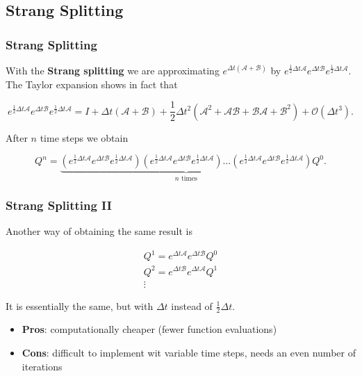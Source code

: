 \documentclass{beamer}
\newcommand{\ca}{\mathcal{A}}
\newcommand{\cb}{\mathcal{B}}
\renewcommand{\d}{\Delta}
\renewcommand{\emph}[1]{\textcolor{tum}{\textbf{#1}}}
\begin{document}
\subsection{Strang Splitting}
\begin{frame}
	\frametitle{Strang Splitting}
	With the \emph{Strang splitting} we are approximating $e^{\d t(\ca +\cb)}$ by $e^{\frac{1}{2}\d t\ca}e^{\d t\cb}e^{\frac{1}{2}\d t\ca}$. The Taylor expansion shows in fact that

	\begin{equation}
		e^{\frac{1}{2}\d t\ca}e^{\d t\cb}e^{\frac{1}{2}\d t\ca} = I+\d t(\ca + \cb)+\frac{1}{2}\d t^2(\ca^2+\ca\cb+\cb\ca+\cb^2)+\mathcal{O}(\d t^3).
	\end{equation}

	After $n$ time steps we obtain

	\begin{equation}\label{eq:recursion}
		Q^n = \underbrace{(e^{\frac{1}{2}\d t\ca}e^{\d t\cb}e^{\frac{1}{2}\d t\ca})(e^{\frac{1}{2}\d t\ca}e^{\d t\cb}e^{\frac{1}{2}\d t\ca})\dots(e^{\frac{1}{2}\d t\ca}e^{\d t\cb}e^{\frac{1}{2}\d t\ca})}_{n\text{ times}}Q^0.
	\end{equation}


\end{frame}

\begin{frame}
	\frametitle{Strang Splitting II}

	Another way of obtaining the same result is 

	\begin{equation}
		\begin{gathered}
			Q^1 = e^{\d t\ca}e^{\d t\cb}Q^0\\
			Q^2 = e^{\d t\cb}e^{\d t\ca}Q^1\\
			\vdots
		\end{gathered}
	\end{equation}

	It is essentially the same, but with $\d t$ instead of $\frac{1}{2}\d t$. 

	\begin{itemize}
		\item \textbf{Pros}: computationally cheaper (fewer function evaluations)
		\item \textbf{Cons}: difficult to implement wit variable time steps, needs an even number of iterations
	\end{itemize}
\end{frame}
\end{document}
